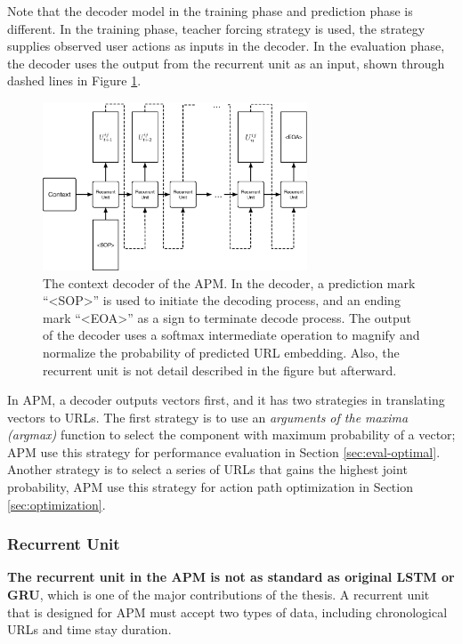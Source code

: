 Note that the decoder model in the training phase and prediction phase is different.
In the training phase, teacher forcing strategy \cite{williams1989learning} is used, 
the strategy supplies observed user actions as inputs in the decoder.
In the evaluation phase, the decoder uses the output from the recurrent unit as an input, 
shown through dashed lines in Figure \ref{fig:decoder}.

\begin{figure}
    \centering
    \includegraphics[width=0.7\textwidth]{figures/decoder}
    \caption{The context decoder of the APM. In the decoder, 
    a prediction mark ``<SOP>'' is used to initiate the decoding process, 
    and an ending mark ``<EOA>'' as a sign to terminate decode process. 
    The output of the decoder uses a softmax intermediate operation to magnify 
    and normalize the probability of predicted URL embedding. Also, the recurrent unit 
    is not detail described in the figure but afterward.}
    \label{fig:decoder}
\end{figure}

In APM, a decoder outputs vectors first, and it has two strategies 
in translating vectors to URLs. 
The first strategy is to use an \emph{arguments of the maxima (argmax)} function to select the component 
with maximum probability of a vector; APM use this strategy for performance evaluation 
in Section \ref{sec:eval-optimal}. Another strategy is to select a series of URLs 
that gains the highest joint probability, APM use this strategy 
for action path optimization in Section \ref{sec:optimization}.

\subsubsection{Recurrent Unit}
\label{sec:recurrent-unit}

\textbf{The recurrent unit in the APM is not as standard as original 
LSTM or GRU}, which is one of the major contributions of the thesis. 
A recurrent unit that is designed for APM must 
accept two types of data, including chronological URLs and time stay duration.

